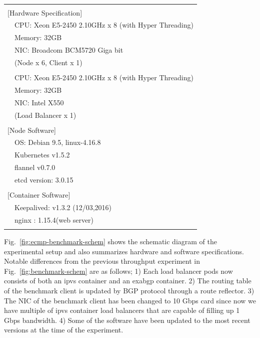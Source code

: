 \begin{table}[]
  \centering
  \begin{tabular}{ll}
    \hline \\
    \multicolumn{2}{l}{[Hardware Specification]}   \\
    & CPU: Xeon E5-2450 2.10GHz x 8 (with Hyper Threading) \\
    & Memory: 32GB \\
    & NIC: Broadcom BCM5720 Giga bit \\
    & (Node x 6, Client x 1) \\
    & \\
    & CPU: Xeon E5-2450 2.10GHz x 8 (with Hyper Threading) \\
    & Memory: 32GB \\
    & NIC: Intel X550 \\
    & (Load Balancer x 1) \\
    & \\
    \multicolumn{2}{l}{[Node Software]}  \\
    & OS: Debian 9.5, linux-4.16.8 \\
    & Kubernetes v1.5.2 \\
    & flannel v0.7.0 \\
    & etcd version: 3.0.15 \\
    & \\
    \multicolumn{2}{l}{[Container Software]}   \\
    & Keepalived: v1.3.2 (12/03,2016) \\
    & nginx : 1.15.4(web server) \\
    \\ \hline
  \end{tabular}
  \caption{}
  \label{tab:ecmp-hw_sw_spec}
\end{table}

Fig.~\ref{fig:ecmp-benchmark-schem} shows the schematic diagram of the experimental setup and also summarizes hardware and software specifications.
Notable differences from the previous throughput experiment in Fig.~\ref{fig:benchmark-schem} are as follows;
1) Each load balancer pods now consists of both an ipvs container and an exabgp container.
2) The routing table of the benchmark client is updated by BGP protocol through a route reflector.
3) The NIC of the benchmark client has been changed to 10 Gbps card since now we have multiple of ipvs container load balancers that are capable of filling up 1 Gbps bandwidth.
4) Some of the software have been updated to the most recent versions at the time of the experiment.


